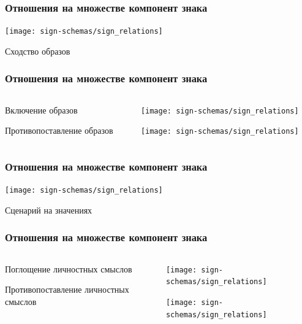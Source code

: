 \documentclass[default]{beamer}
\begin{document}
	\begin{frame}
		\frametitle{Отношения на множестве компонент знака}
		\centering
		\texttt{[image: sign-schemas/sign\_relations]}
		
		Сходство образов
	\end{frame}	
	
	\begin{frame}
		\frametitle{Отношения на множестве компонент знака}
		
		\begin{columns}
			\begin{column}{0.3\textwidth}
				\centering
				Включение образов 
				\par\bigskip
				\par\bigskip
				\par\bigskip
				\par\bigskip
				\par\bigskip
				Противопоставление образов 
				
			\end{column}
			\begin{column}{0.7\textwidth}
				\texttt{[image: sign-schemas/sign\_relations]}
				
				\texttt{[image: sign-schemas/sign\_relations]}
			\end{column}
		\end{columns}
		
	\end{frame}	
	
	\begin{frame}
		\frametitle{Отношения на множестве компонент знака}
		\centering
		\texttt{[image: sign-schemas/sign\_relations]}
		
		Сценарий на значениях
	\end{frame}	
	
	\begin{frame}
		\frametitle{Отношения на множестве компонент знака}
		
		\begin{columns}
			\begin{column}{0.3\textwidth}
				\centering
				Поглощение личностных смыслов 
				\par\bigskip
				\par\bigskip
				\par\bigskip
				\par\bigskip
				\par\bigskip
				Противопоставление личностных смыслов 
				
			\end{column}
			\begin{column}{0.7\textwidth}
				\texttt{[image: sign-schemas/sign\_relations]}
				\par\bigskip
				\texttt{[image: sign-schemas/sign\_relations]}
			\end{column}
		\end{columns}
	\end{frame}	
\end{document}
